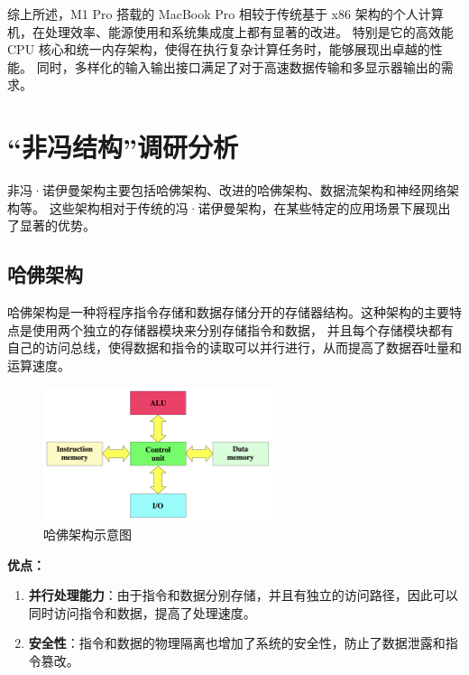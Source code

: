 \documentclass[12pt]{article} %
\theoremstyle{definition}
\begin{document}
综上所述，M1 Pro 搭载的 MacBook Pro 相较于传统基于 x86 架构的个人计算机，在处理效率、能源使用和系统集成度上都有显著的改进。
特别是它的高效能 CPU 核心和统一内存架构，使得在执行复杂计算任务时，能够展现出卓越的性能。
同时，多样化的输入输出接口满足了对于高速数据传输和多显示器输出的需求。

\section{“非冯结构”调研分析}

非冯·诺伊曼架构主要包括哈佛架构、改进的哈佛架构、数据流架构和神经网络架构等\cite{Siriwardhane2020ComputerArchitecture}。
这些架构相对于传统的冯·诺伊曼架构，在某些特定的应用场景下展现出了显著的优势。

\subsection{哈佛架构}

哈佛架构是一种将程序指令存储和数据存储分开的存储器结构。这种架构的主要特点是使用两个独立的存储器模块来分别存储指令和数据，
并且每个存储模块都有自己的访问总线，使得数据和指令的读取可以并行进行，从而提高了数据吞吐量和运算速度\cite{HarvardArchitecture, Pawson2022MythHarvard}。

\begin{figure}[h]
  \centering
  \includegraphics[width=0.6\textwidth]{./figs/Harvard_architecture.png}
  \caption{哈佛架构示意图\cite{HarvardArchitecture}}
  \label{fig:harvard-architecture}
\end{figure}

\textbf{优点：}
\begin{enumerate}
  \item \textbf{并行处理能力}：由于指令和数据分别存储，并且有独立的访问路径，因此可以同时访问指令和数据，提高了处理速度。
  \item \textbf{安全性}：指令和数据的物理隔离也增加了系统的安全性，防止了数据泄露和指令篡改。
\end{enumerate}
\end{document}
